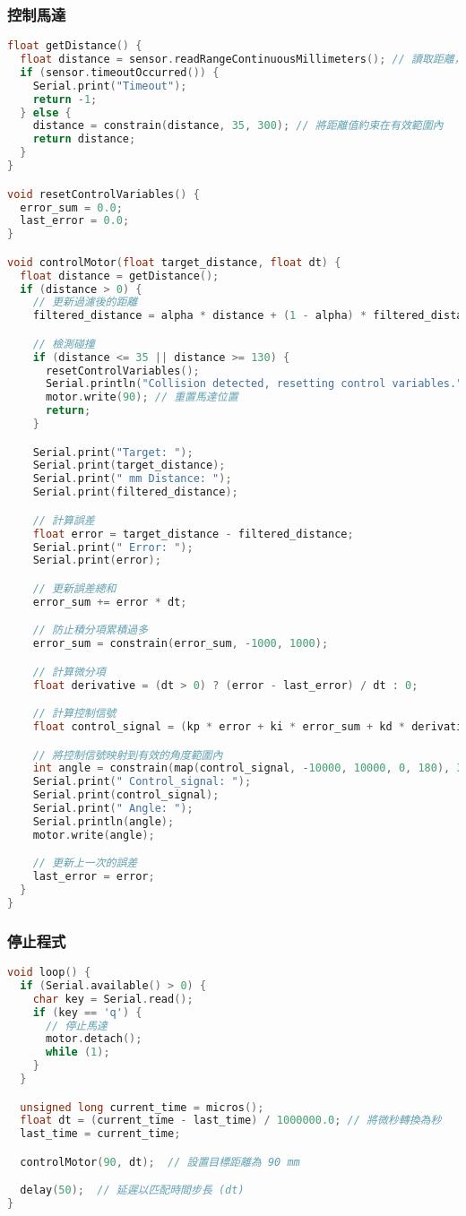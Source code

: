 \subsubsection{控制馬達}
\begin{lstlisting}[language=C]
float getDistance() {
  float distance = sensor.readRangeContinuousMillimeters(); // 讀取距離，單位毫米
  if (sensor.timeoutOccurred()) {
    Serial.print("Timeout");
    return -1;
  } else {
    distance = constrain(distance, 35, 300); // 將距離值約束在有效範圍內
    return distance;
  }
}

void resetControlVariables() {
  error_sum = 0.0;
  last_error = 0.0;
}

void controlMotor(float target_distance, float dt) {
  float distance = getDistance();
  if (distance > 0) {
    // 更新過濾後的距離
    filtered_distance = alpha * distance + (1 - alpha) * filtered_distance;

    // 檢測碰撞
    if (distance <= 35 || distance >= 130) {
      resetControlVariables();
      Serial.println("Collision detected, resetting control variables.");
      motor.write(90); // 重置馬達位置
      return;
    }

    Serial.print("Target: ");
    Serial.print(target_distance);
    Serial.print(" mm Distance: ");
    Serial.print(filtered_distance);

    // 計算誤差
    float error = target_distance - filtered_distance;
    Serial.print(" Error: ");
    Serial.print(error);

    // 更新誤差總和
    error_sum += error * dt;

    // 防止積分項累積過多
    error_sum = constrain(error_sum, -1000, 1000);

    // 計算微分項
    float derivative = (dt > 0) ? (error - last_error) / dt : 0;

    // 計算控制信號
    float control_signal = (kp * error + ki * error_sum + kd * derivative);

    // 將控制信號映射到有效的角度範圍內
    int angle = constrain(map(control_signal, -10000, 10000, 0, 180), 36 , 144);
    Serial.print(" Control_signal: ");
    Serial.print(control_signal);
    Serial.print(" Angle: ");
    Serial.println(angle);
    motor.write(angle);

    // 更新上一次的誤差
    last_error = error;
  }
}
\end{lstlisting}

\subsubsection{停止程式}
\begin{lstlisting}[language=C]
void loop() {
  if (Serial.available() > 0) {
    char key = Serial.read();
    if (key == 'q') {
      // 停止馬達
      motor.detach();
      while (1);
    }
  }

  unsigned long current_time = micros();
  float dt = (current_time - last_time) / 1000000.0; // 將微秒轉換為秒
  last_time = current_time;

  controlMotor(90, dt);  // 設置目標距離為 90 mm

  delay(50);  // 延遲以匹配時間步長 (dt)
}
  \end{lstlisting}

